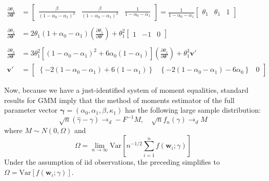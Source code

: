 \documentclass[12pt]{article}
\begin{document}
\begin{align*}
  \frac{\partial \theta_1}{\partial \boldsymbol{\vartheta}'} &= 
  \left[
  \begin{array}{ccc}
    \displaystyle \frac{\beta}{(1 - \alpha_0 - \alpha_1)^2} &
    \displaystyle \frac{\beta}{(1 - \alpha_0 - \alpha_1)^2} &
    \displaystyle \frac{1}{1 - \alpha_0 - \alpha_1}
  \end{array}
\right] = \frac{1}{1 - \alpha_0 - \alpha_1}\left[
\begin{array}{ccc}
  \theta_1 & \theta_1 & 1
\end{array}
\right]\\ \\ 
  \frac{\partial \theta_2}{\partial \boldsymbol{\vartheta}'} &= 2\theta_1(1 + \alpha_0 - \alpha_1) \left( \frac{\partial \theta_1}{\partial\boldsymbol{\vartheta}'} \right) +  \theta_1^2 \left[
  \begin{array}{ccc}
    1& -1 & 0
  \end{array}
\right] \\ \\ 
  \frac{\partial \theta_3}{\partial \boldsymbol{\vartheta}'} &= 3\theta_1^2 \left[ (1 - \alpha_0 - \alpha_1)^2 + 6 \alpha_0 (1 - \alpha_1) \right] \left( \frac{\partial \theta_1}{\partial \boldsymbol{\vartheta}'} \right) +  \theta_1^3 \mathbf{v}'\\
  \mathbf{v}' &= \left[
  \begin{array}{ccc}
    \left\{-2(1 - \alpha_0 - \alpha_1) + 6(1 - \alpha_1)\right\} & \left\{-2(1 - \alpha_0 - \alpha_1) - 6\alpha_0\right\} & 0
  \end{array}
\right]
\end{align*}

Now, because we have a just-identified system of moment equalities, standard results for GMM imply that the method of moments estimator of the full parameter vector $\boldsymbol{\gamma} = (\alpha_0, \alpha_1, \beta, \kappa_1)$ has the following large sample distribution:
\[
  \sqrt{n}\left( \widehat{\gamma} - \gamma \right) \rightarrow_d -F^{-1} M, \quad \sqrt{n}f_n(\gamma) \rightarrow_d M
\]
where $M \sim N(0, \Omega)$ and
\[
  \Omega = \lim_{n\rightarrow \infty}\mbox{Var}\left[ n^{-1/2}\sum_{i=1}^n f(\mathbf{w}_i; \gamma) \right]
\]
Under the assumption of iid observations, the preceding simplifies to $\Omega = \mbox{Var}\left[ f(\mathbf{w}_i;\gamma) \right]$.
\end{document}
